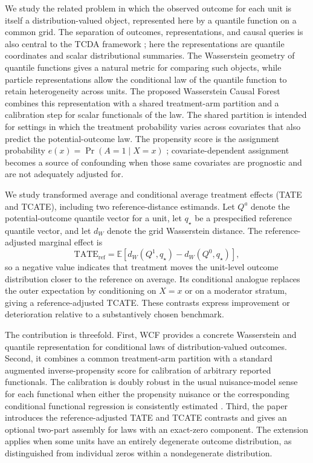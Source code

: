 \documentclass[11pt]{article}
\newcommand{\E}{\mathbb{E}}
\begin{document}
We study the related problem in which the observed outcome for each unit is itself a distribution-valued object, represented here by a quantile function on a common grid. The separation of outcomes, representations, and causal queries is also central to the TCDA framework \citep{souto_diamantis_tcda_2026}; here the representations are quantile coordinates and scalar distributional summaries. The Wasserstein geometry of quantile functions gives a natural metric for comparing such objects, while particle representations allow the conditional law of the quantile function to retain heterogeneity across units. The proposed Wasserstein Causal Forest combines this representation with a shared treatment-arm partition and a calibration step for scalar functionals of the law. The shared partition is intended for settings in which the treatment probability varies across covariates that also predict the potential-outcome law. The propensity score is the assignment probability $e(x)=\Pr(A=1\mid X=x)$ \citep{rosenbaum1983propensity}; covariate-dependent assignment becomes a source of confounding when those same covariates are prognostic and are not adequately adjusted for.

We study transformed average and conditional average treatment effects (TATE and TCATE), including two reference-distance estimands. Let $Q^a$ denote the potential-outcome quantile vector for a unit, let $q_\star$ be a prespecified reference quantile vector, and let $d_W$ denote the grid Wasserstein distance. The reference-adjusted marginal effect is
\[
\mathrm{TATE}_{\mathrm{ref}}
=\E\left[d_W(Q^1,q_\star)-d_W(Q^0,q_\star)\right],
\]
so a negative value indicates that treatment moves the unit-level outcome distribution closer to the reference on average. Its conditional analogue replaces the outer expectation by conditioning on $X=x$ or on a moderator stratum, giving a reference-adjusted TCATE. These contrasts express improvement or deterioration relative to a substantively chosen benchmark.

The contribution is threefold. First, WCF provides a concrete Wasserstein and quantile representation for conditional laws of distribution-valued outcomes. Second, it combines a common treatment-arm partition with a standard augmented inverse-propensity score for calibration of arbitrary reported functionals. The calibration is doubly robust in the usual nuisance-model sense for each functional when either the propensity nuisance or the corresponding conditional functional regression is consistently estimated \citep{bang2005doubly,chernozhukov2018double}. Third, the paper introduces the reference-adjusted TATE and TCATE contrasts and gives an optional two-part assembly for laws with an exact-zero component. The extension applies when some units have an entirely degenerate outcome distribution, as distinguished from individual zeros within a nondegenerate distribution.
\end{document}

